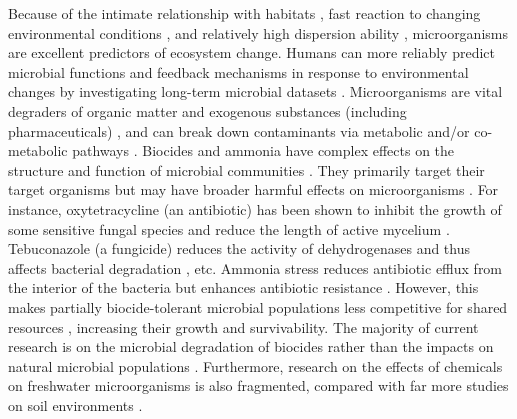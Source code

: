 \documentclass[11pt, a4paper]{article}
\begin{document}
\begin{spacing}{1.5}
Because of the intimate relationship with habitats \citep{falkowski2008microbial}, fast reaction to changing environmental conditions \citep{xue2016tundra}, and relatively high dispersion ability \citep{barberan2014microbial}, microorganisms are excellent predictors of ecosystem change. Humans can more reliably predict microbial functions and feedback mechanisms in response to environmental changes by investigating long-term microbial datasets \citep{buttigieg2018marine, saba2010challenges}. Microorganisms are vital degraders of organic matter and exogenous substances (including pharmaceuticals) \citep{paul2005accessing}, and can break down contaminants via metabolic and/or co-metabolic pathways \citep{caracciolo2015pharmaceuticals, topp2013accelerated}. Biocides and ammonia have complex effects on the structure and function of microbial communities \citep{melendez1993effects, widenfalk2004effects,zhang2020ammonia}. They primarily target their target organisms but may have broader harmful effects on microorganisms \citep{delorenzo2001toxicity}. For instance, oxytetracycline (an antibiotic) has been shown to inhibit the growth of some sensitive fungal species and reduce the length of active mycelium \citep{colinas1994population}. Tebuconazole (a fungicide) reduces the activity of dehydrogenases and thus affects bacterial degradation \citep{bending2007fungicide}, etc. Ammonia stress reduces antibiotic efflux from the interior of the bacteria but enhances antibiotic resistance \citep{zhang2020ammonia}. However, this makes partially biocide-tolerant microbial populations less competitive for shared resources \citep{johnsen2001pesticide}, increasing their growth and survivability. The majority of current research is on the microbial degradation of biocides rather than the impacts on natural microbial populations \citep{aislabie1995review, singh2006microbial}. Furthermore, research on the effects of chemicals on freshwater microorganisms is also fragmented, compared with far more studies on soil environments \citep{hussain2009impact, lupwayi2009changes}.


\end{spacing}
\end{document}

